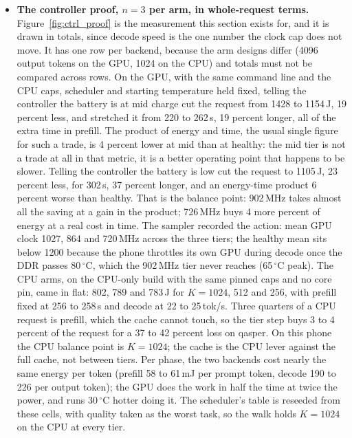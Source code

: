 \documentclass[11pt]{article}
\begin{document}
\begin{itemize}
\item \textbf{The controller proof, $n{=}3$ per arm, in whole-request terms.}
Figure~\ref{fig:ctrl_proof} is the measurement this section exists for, and it is drawn in
totals, since decode speed is the one number the clock cap does not move. It has one row per
backend, because the arm designs differ (4096 output tokens on the GPU, 1024 on the CPU) and
totals must not be compared across rows. On the GPU, with the same command line and the CPU
caps, scheduler and starting temperature held fixed, telling the controller the battery is
at mid charge cut the request from 1428 to 1154\,J, 19 percent less, and stretched it from
220 to 262\,s, 19 percent longer, all of the extra time in prefill. The product of energy and
time, the usual single figure for such a trade, is 4 percent lower at mid than at healthy:
the mid tier is not a trade at all in that metric, it is a better operating point that
happens to be slower. Telling the controller the battery is low cut the request to 1105\,J,
23 percent less, for 302\,s, 37 percent longer, and an energy-time product 6 percent worse
than healthy. That is the balance point: 902\,MHz takes almost all the saving at a gain in
the product; 726\,MHz buys 4 more percent of energy at a real cost in time. The sampler
recorded the action: mean GPU clock 1027, 864 and 720\,MHz across the three tiers; the
healthy mean sits below 1200 because the phone throttles its own GPU during decode once the
DDR passes 80\,$^\circ$C, which the 902\,MHz tier never reaches (65\,$^\circ$C peak). The CPU
arms, on the CPU-only build with the same pinned caps and no core pin, came in flat: 802, 789
and 783\,J for $K{=}1024$, 512 and 256, with prefill fixed at 256 to 258\,s and decode at 22
to 25\,tok/s. Three quarters of
a CPU request is prefill, which the cache cannot touch, so the tier step buys 3 to 4 percent
of the request for a 37 to 42 percent loss on qasper. On this phone the CPU balance point
is $K{=}1024$; the cache is the CPU lever against the full cache, not between tiers. Per
phase, the two backends cost nearly the same energy per token (prefill 58 to 61\,mJ per
prompt token, decode 190 to 226 per output token); the GPU does the work in half the time at
twice the power, and runs 30\,$^\circ$C hotter doing it. The scheduler's table is reseeded
from these cells, with quality taken as the worst task, so the walk holds $K{=}1024$ on the
CPU at every tier.


\end{itemize}
\end{document}
